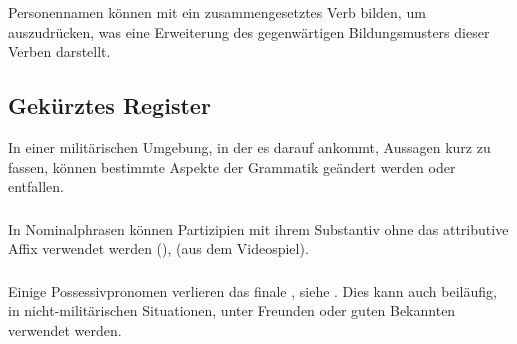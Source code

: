 \subsubsection{}Personennamen können mit  ein zusammengesetztes Verb bilden, um  auszudrücken, was eine Erweiterung des gegenwärtigen Bildungsmusters dieser Verben darstellt.

\subsection{Gekürztes Register} In einer militärischen Umgebung, in der es darauf ankommt, Aussagen kurz zu fassen, können bestimmte Aspekte der Grammatik geändert werden oder entfallen.

\subsubsection{} In Nominalphrasen können Partizipien mit ihrem Substantiv ohne das attributive Affix  verwendet werden (),   (aus dem Videospiel).

\subsubsection{} Einige Possessivpronomen verlieren das finale , siehe . Dies kann auch beiläufig, in nicht-militärischen Situationen, unter Freunden oder guten Bekannten verwendet werden.
